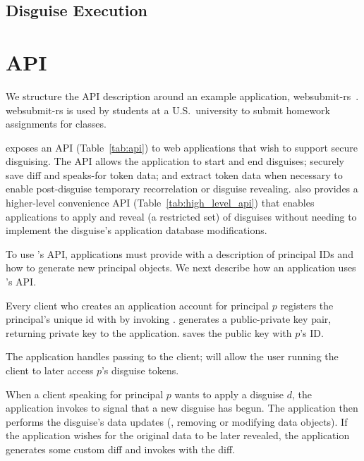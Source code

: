 \subsection{Disguise Execution}
%


\section{API}
\label{s:api}


%
We structure the API description around an example application, websubmit-rs~\cite{websubmit-rs}.
%
websubmit-rs is used by students at a U.S.\ university to submit homework assignments for classes.
%


\sys exposes an API (Table~\ref{tab:api}) to web applications that wish to support secure
disguising.
%
The API allows the application to start and end disguises; securely save diff and speaks-for token
data; and extract token data when necessary to enable post-disguise temporary recorrelation or
disguise revealing.
%
\sys also provides a higher-level convenience API (Table~\ref{tab:high_level_api}) that enables
applications to apply and reveal (a restricted set) of disguises without needing to implement the
disguise's application database modifications.

To use \sys's API, applications must provide \sys with a description of principal IDs and how to
generate new principal objects.
We next describe how an application uses \sys's API.

Every client who creates an application account for principal $p$ registers the principal's unique id
with \sys by invoking . \sys generates a public-private key pair, returning private key  to the
application. \sys saves the public key  with $p$'s ID.

The application handles passing  to the client;  will allow the user running the
client to later access $p$'s disguise tokens.

When a client speaking for principal $p$ wants to apply a disguise $d$,
the application invokes  to signal \sys that a new disguise has begun.
The application then performs the disguise's data updates (\eg, removing or modifying
data objects). If the application wishes for the original data to be later revealed, the
application generates some custom diff and invokes  with the diff.

